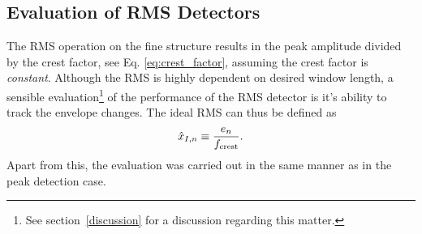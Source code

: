 \documentclass[../main2.tex]{subfiles}
\begin{document}
\subsection{Evaluation of RMS Detectors}\label{method_rms_detectors}
The RMS operation on the fine structure results in the peak amplitude divided by the crest factor, see Eq. \eqref{eq:crest_factor}, assuming the crest factor is \emph{constant}. Although the RMS is highly dependent on desired window length, a sensible evaluation\footnote{See section~\ref{discussion} for a discussion regarding this matter.} of the performance of the RMS detector is it's ability to track the envelope changes. The ideal RMS can thus be defined as
\begin{align}
\hat{x}_{I,n} \equiv \frac{e_n}{f_\text{crest}} \label{eq:ideal_rms}.
\end{align}
Apart from this, the evaluation was carried out in the same manner as in the peak detection case.
\end{document}
